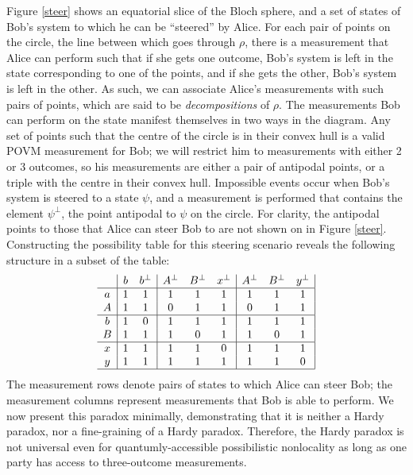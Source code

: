 \documentclass[reprint]{revtex4-1}
\theoremstyle{definition}
\begin{document}
Figure \ref{steer} shows an equatorial slice of the Bloch sphere, and a set of states of Bob's system to which he can be ``steered'' by Alice. For each pair of points on the circle, the line between which goes through $\rho$, there is a measurement that Alice can perform such that if she gets one outcome, Bob's system is left in the state corresponding to one of the points, and if she gets the other, Bob's system is left in the other. As such, we can associate Alice's measurements with such pairs of points, which are said to be \emph{decompositions} of $\rho$. The measurements Bob can perform on the state manifest themselves in two ways in the diagram. Any set of points such that the centre of the circle is in their convex hull is a valid POVM measurement for Bob; we will restrict him to measurements with either 2 or 3 outcomes, so his measurements are either a pair of antipodal points, or a triple with the centre in their convex hull. Impossible events occur when Bob's system is steered to a state $\psi$, and a measurement is performed that contains the element $\psi^\perp$, the point antipodal to $\psi$ on the circle. For clarity, the antipodal points to those that Alice can steer Bob to are not shown on in Figure \ref{steer}. Constructing the possibility table for this steering scenario reveals the following structure in a subset of the table:
\begin{equation*}
\begin{array}{ c  | c c | c c c| c c c|}\
  & b&b^\perp& A^\perp &B^\perp&x^\perp& A^\perp &B^\perp&y^\perp \\ \hline
  a &1&1&1&1&1&1&1&1\\ 
  A &1&1&0&1&1&0&1&1\\ \hline
  b &1&0&1&1&1&1&1&1\\ 
 B  &1&1&1&0&1&1&0&1\\ \hline
 x &1&1&1&1&0&1&1&1\\ 
 y &1&1&1&1&1&1&1&0\\ \hline
\end{array}
\end{equation*}
The measurement rows denote pairs of states to which Alice can steer Bob; the measurement columns represent measurements that Bob is able to perform.
We now present this paradox minimally, demonstrating that it is neither a Hardy paradox, nor a fine-graining of a Hardy paradox. Therefore, the Hardy paradox is not universal even for quantumly-accessible possibilistic nonlocality as long as one party has access to three-outcome measurements. 
\end{document}
